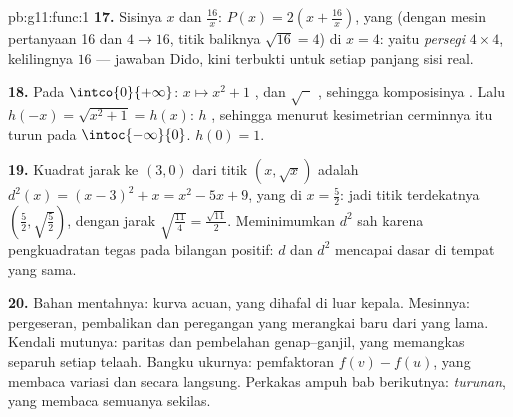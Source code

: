 \begin{solution}{pb:g11:func:1}
\textbf{17.} Sisinya $x$ dan $\frac{16}{x}$:
$P(x) = 2\left(x + \frac{16}{x}\right)$, yang  (dengan mesin
pertanyaan 16 dan $4 \to 16$, titik baliknya $\sqrt{16} = 4$)
di $x = 4$: yaitu \emph{persegi} $4 \times 4$, kelilingnya $16$ ---
jawaban Dido, kini terbukti untuk setiap panjang sisi real.

\textbf{18.} Pada $\intco{0}{+\infty}$: $x \mapsto x^2 + 1$
, dan $\sqrt{\phantom{x}}$ , sehingga
komposisinya . Lalu $h(-x) = \sqrt{x^2 + 1} = h(x)$: $h$
, sehingga menurut kesimetrian cerminnya  itu turun pada
$\intoc{-\infty}{0}$.  $h(0) = 1$.

\textbf{19.} Kuadrat jarak ke $(3, 0)$ dari titik
$(x, \sqrt x)$ adalah
$d^2(x) = (x - 3)^2 + x = x^2 - 5x + 9$, yang  di
$x = \frac52$: jadi titik terdekatnya
$\left(\frac52, \sqrt{\frac52}\right)$, dengan jarak
$\sqrt{\frac{11}{4}} = \frac{\sqrt{11}}{2}$. Meminimumkan $d^2$
sah karena pengkuadratan tegas  pada
bilangan positif: $d$ dan $d^2$ mencapai dasar di tempat yang sama.

\textbf{20.} Bahan mentahnya: kurva acuan, yang dihafal di luar kepala.
Mesinnya: pergeseran, pembalikan dan peregangan yang merangkai  baru
dari yang lama. Kendali mutunya: paritas dan pembelahan genap--ganjil,
yang memangkas separuh setiap telaah. Bangku ukurnya: pemfaktoran
$f(v) - f(u)$, yang membaca variasi dan  secara langsung. Perkakas
ampuh bab berikutnya: \emph{turunan}, yang membaca semuanya sekilas.

\end{solution}
